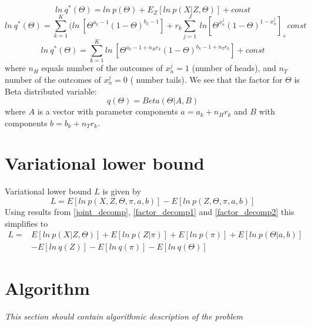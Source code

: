 \documentclass{article}
\newcommand\JointProb{p(X,Z,\Theta,\pi,a,b)}
\newcommand\Factorized{p(Z,\Theta,\pi,a,b)}
\newcommand\SumK{\sum_{k=1}^{K}}
\newcommand\SumJ{\sum_{j=1}^{J}}
\begin{document}
\begin{equation}
    ln\:q^*(\Theta) = ln\:p(\Theta) + E_Z[ln\:p(X|Z,\Theta)] + const
\end{equation}
\begin{equation}
    ln\:q^*(\Theta) = \SumK (ln\:[\Theta^{a_k-1}(1-\Theta)^{b_k-1}] + r_{k}\SumJ \:ln[\Theta^{x_n^j}(1-\Theta)^{1-x_n^j}]_ + const
\end{equation}
\begin{equation}
    ln\:q^*(\Theta) = \SumK ln\:[\Theta^{a_k-1+n_H{r_k}}(1-\Theta)^{b_k-1+n_T{r_k}}] + const
\end{equation}
where $n_H$ equals number of the outcomes of $x_n^j = 1$ (number of heads), and $n_T$ number of the outcomes of $x_n^j = 0$ ( number tails).
We see that the factor for $\Theta$ is Beta distributed variable:
\begin{equation}
    q(\Theta) = Beta(\Theta|A, B)
\end{equation}
where $A$ is a vector with parameter components $a = a_{k}+n_H{r_k}$ and $B$ with components $b = b_{k}+n_T{r_k}$.
\section{Variational lower bound}
Variational lower bound $L$ is given by 
\begin{equation}
    L = E[ln\:\JointProb{}] - E[ln\:\Factorized{}]
\end{equation}
Using results from \ref{joint_decomp}, \ref{factor_decomp1} and \ref{factor_decomp2}
this simplifies to
\begin{equation}
\begin{split}
    L =& E[ln\:p(X|Z,\Theta)] + E[ln\:p(Z|\pi)] + E[ln\:p(\pi)] + E[ln\:p(\Theta|a,b)] \\
    & -E[ln\:q(Z)] - E[ln\:q(\pi)] - E[ln\:q(\Theta)]
\end{split}        
\end{equation}
\section{Algorithm}
\textit{This section should contain algorithmic description of the problem}
\end{document}
